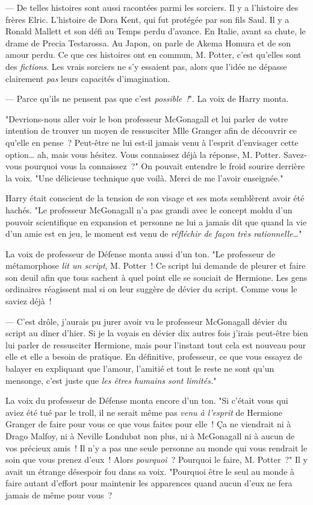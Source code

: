 --- De telles histoires sont aussi racontées parmi les sorciers. Il y a l'histoire des frères Elric. L'histoire de Dora Kent, qui fut protégée par son fils Saul. Il y a Ronald Mallett et son défi au Temps perdu d'avance. En Italie, avant sa chute, le drame de Precia Testarossa. Au Japon, on parle de Akema Homura et de son amour perdu. Ce que ces histoires ont en commun, M. Potter, c'est qu'elles sont des \emph{fictions}. Les vrais sorciers ne s'y essaient pas, alors que l'idée ne dépasse clairement \emph{pas} leurs capacités d'imagination.

--- Parce qu'ils ne pensent pas que c'est \emph{possible~!}". La voix de Harry monta.

"Devrions-nous aller voir le bon professeur McGonagall et lui parler de votre intention de trouver un moyen de ressusciter Mlle Granger afin de découvrir ce qu'elle en pense~? Peut-être ne lui est-il jamais venu à l'esprit d'envisager cette option… ah, mais vous hésitez. Vous connaissez déjà la réponse, M. Potter. Savez-vous pourquoi vous la connaissez~?" On pouvait entendre le froid sourire derrière la voix. "Une délicieuse technique que voilà. Merci de me l'avoir enseignée."

Harry était conscient de la tension de son visage et ses mots semblèrent avoir été hachés. "Le professeur McGonagall n'a pas grandi avec le concept moldu d'un pouvoir scientifique en expansion et personne ne lui a jamais dit que quand la vie d'un amie est en jeu, le moment est venu de \emph{réfléchir de façon très rationnelle…}"

La voix de professeur de Défense monta aussi d'un ton. "Le professeur de métamorphose \emph{lit un script}, M. Potter~! Ce script lui demande de pleurer et faire son deuil afin que tous sachent à quel point elle se souciait de Hermione. Les gens ordinaires réagissent mal si on leur suggère de dévier du script. Comme vous le saviez déjà~!

--- C'est drôle, j'aurais pu jurer avoir vu le professeur McGonagall dévier du script au dîner d'hier. Si je la voyais en dévier dix autres fois j'irais peut-être bien lui parler de ressusciter Hermione, mais pour l'instant tout cela est nouveau pour elle et elle a besoin de pratique. En définitive, professeur, ce que vous essayez de balayer en expliquant que l'amour, l'amitié et tout le reste ne sont qu'un mensonge, c'est juste que \emph{les êtres humains sont limités.}"

La voix du professeur de Défense monta encore d'un ton. "Si c'était vous qui aviez été tué par le troll, il ne serait même pas \emph{venu à l'esprit} de Hermione Granger de faire pour vous ce que vous faites pour elle~! Ça ne viendrait ni à Drago Malfoy, ni à Neville Londubat non plus, ni à McGonagall ni à aucun de vos précieux amis~! Il n'y a pas une seule personne au monde qui vous rendrait le soin que vous prenez d'eux~! Alors \emph{pourquoi}~? Pourquoi le faire, M. Potter~?" Il y avait un étrange désespoir fou dans sa voix. "Pourquoi être le seul au monde à faire autant d'effort pour maintenir les apparences quand aucun d'eux ne fera jamais de même pour vous~?

